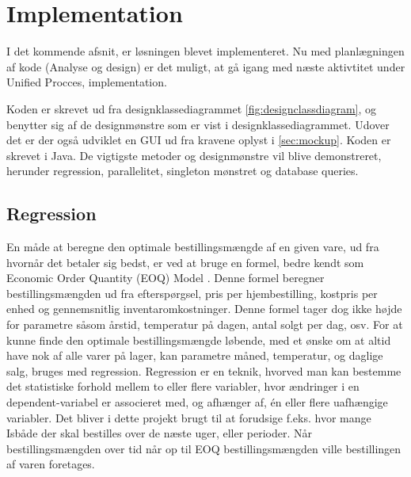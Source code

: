 \chapter{Implementation}\label{ch:implementation}
I det kommende afsnit, er løsningen blevet implementeret. Nu med planlægningen af kode (Analyse og design) er det muligt, at gå igang med næste aktivtitet under Unified Procces, implementation\cite{UnifiedProcess}. 

Koden er skrevet ud fra designklassediagrammet \ref{fig:designclassdiagram}, og benytter sig af de designmønstre som er vist i designklassediagrammet. Udover det er der også udviklet en GUI ud fra kravene oplyst i \ref{sec:mockup}. Koden er skrevet i Java. 
De vigtigste metoder og designmønstre vil blive demonstreret, herunder regression, parallelitet, singleton mønstret og database queries.




\section{Regression}
En måde at beregne den optimale bestillingsmængde af en given vare, ud fra hvornår det betaler sig bedst, er ved at bruge en formel, bedre kendt som Economic Order Quantity (EOQ) Model \cite{EOQ}. Denne formel beregner bestillingsmængden ud fra efterspørgsel, pris per hjembestilling, kostpris per enhed og gennemsnitlig inventaromkostninger. Denne formel tager dog ikke højde for parametre såsom årstid, temperatur på dagen, antal solgt per dag, osv. For at kunne finde den optimale bestillingsmængde løbende, med et ønske om at altid have nok af alle varer på lager, kan parametre måned, temperatur, og daglige salg, bruges med regression. Regression er en teknik, hvorved man kan bestemme det statistiske forhold mellem to eller flere variabler, hvor ændringer i en dependent-variabel er associeret med, og afhænger af, én eller flere uafhængige variabler. Det bliver i dette projekt brugt til at forudsige f.eks. hvor mange Isbåde\cite{Isbåd} der skal bestilles over de næste uger, eller perioder. Når bestillingsmængden over tid når op til EOQ bestillingsmængden ville bestillingen af varen foretages.


